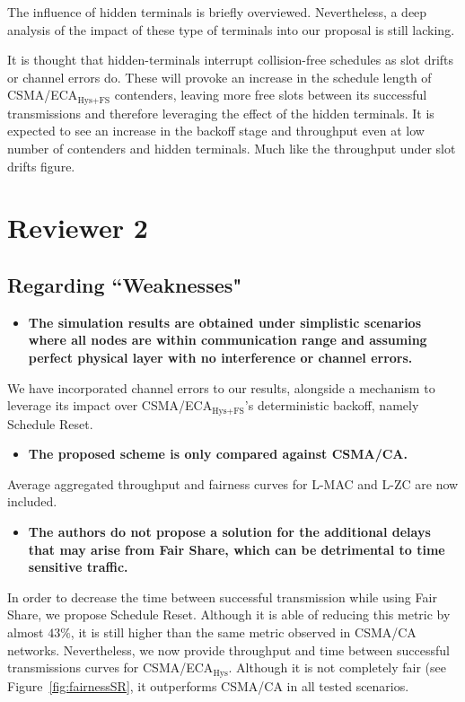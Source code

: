 \documentclass[]{article}
\begin{document}
		The influence of hidden terminals is briefly overviewed. Nevertheless, a deep analysis of the impact of these type of terminals into our proposal is still lacking.
		
		It is thought that hidden-terminals interrupt collision-free schedules as slot drifts or channel errors do. These will provoke an increase in the schedule length of CSMA/ECA$_{\text{Hys+FS}}$ contenders, leaving more free slots between its successful transmissions and therefore leveraging the effect of the hidden terminals. It is expected to see an increase in the backoff stage and throughput even at low number of contenders and hidden terminals. Much like the throughput under slot drifts figure.
		
\section{Reviewer 2}
	\subsection{Regarding ``Weaknesses"}
	\begin{itemize}
		\item {\bfseries The simulation results are obtained under simplistic scenarios where all nodes are within communication range and assuming perfect physical layer with no interference or channel errors.}
	\end{itemize}
	
	We have incorporated channel errors to our results, alongside a mechanism to leverage its impact over CSMA/ECA$_{\text{Hys+FS}}$'s deterministic backoff, namely Schedule Reset.
	
	\begin{itemize}
		\item {\bfseries The proposed scheme is only compared against CSMA/CA.}
	\end{itemize}

	Average aggregated throughput and fairness curves for L-MAC and L-ZC are now included.
	
	\begin{itemize}
		\item {\bfseries The authors do not propose a solution for the additional delays that may arise from Fair Share, which can be detrimental to time sensitive traffic.}
	\end{itemize}
	
	In order to decrease the time between successful transmission while using Fair Share, we propose Schedule Reset. Although it is able of reducing this metric by almost $43\%$, it is still higher than the same metric observed in CSMA/CA networks. Nevertheless, we now provide throughput and time between successful transmissions curves for CSMA/ECA$_{\text{Hys}}$. Although it is not completely fair (see Figure~\ref{fig:fairnessSR}, it outperforms CSMA/CA in all tested scenarios.
\end{document}
